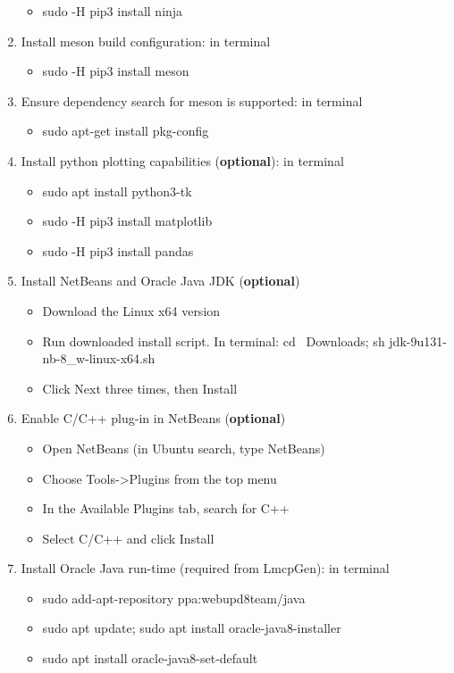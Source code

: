 \begin{enumerate}
  \begin{itemize}
  \tightlist
  \item
    sudo -H pip3 install ninja
  \end{itemize}
\item
  Install meson build configuration: in terminal

  \begin{itemize}
  \tightlist
  \item
    sudo -H pip3 install meson
  \end{itemize}
\item
  Ensure dependency search for meson is supported: in terminal

  \begin{itemize}
  \tightlist
  \item
    sudo apt-get install pkg-config
  \end{itemize}
\item
  Install python plotting capabilities (\textbf{optional}): in terminal

  \begin{itemize}
  \item
    sudo apt install python3-tk
  \item
    sudo -H pip3 install matplotlib
  \item
    sudo -H pip3 install pandas
  \end{itemize}
\item
  Install NetBeans and Oracle Java JDK (\textbf{optional})

  \begin{itemize}
  \item
    Download the Linux x64 version
  \item
    Run downloaded install script. In terminal: cd ~Downloads; sh
    jdk-9u131-nb-8\_w-linux-x64.sh
  \item
    Click Next three times, then Install
  \end{itemize}
\item
  Enable C/C++ plug-in in NetBeans (\textbf{optional})

  \begin{itemize}
  \item
    Open NetBeans (in Ubuntu search, type NetBeans)
  \item
    Choose Tools-\textgreater{}Plugins from the top menu
  \item
    In the Available Plugins tab, search for C++
  \item
    Select C/C++ and click Install
  \end{itemize}
\item
  Install Oracle Java run-time (required from LmcpGen): in terminal

  \begin{itemize}
  \item
    sudo add-apt-repository ppa:webupd8team/java
  \item
    sudo apt update; sudo apt install oracle-java8-installer
  \item
    sudo apt install oracle-java8-set-default
  \end{itemize}
\end{enumerate}


